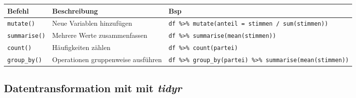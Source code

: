 \documentclass[
  custompaper,
  DIV=11,
  numbers=noendperiod]{scrartcl}
\begin{document}
\begin{longtable}[]{@{}
  >{\raggedright\arraybackslash}p{}
  >{\raggedright\arraybackslash}p{}
  >{\raggedright\arraybackslash}p{}@{}}
\toprule\noalign{}
\begin{minipage}[b]{\linewidth}\raggedright
Befehl
\end{minipage} & \begin{minipage}[b]{\linewidth}\raggedright
Beschreibung
\end{minipage} & \begin{minipage}[b]{\linewidth}\raggedright
Bsp
\end{minipage} \\
\midrule\noalign{}
\endhead
\bottomrule\noalign{}
\endlastfoot
\texttt{mutate()} & Neue Variablen hinzufügen &
\texttt{df\ \%\textgreater{}\%\ mutate(anteil\ =\ stimmen\ /\ sum(stimmen))} \\
\texttt{summarise()} & Mehrere Werte zusammenfassen &
\texttt{df\ \%\textgreater{}\%\ summarise(mean(stimmen))} \\
\texttt{count()} & Häufigkeiten zählen &
\texttt{df\ \%\textgreater{}\%\ count(partei)} \\
\texttt{group\_by()} & Operationen gruppenweise ausführen &
\texttt{df\ \%\textgreater{}\%\ group\_by(partei)\ \%\textgreater{}\%\ summarise(mean(stimmen))} \\
\end{longtable}

\subsection{\texorpdfstring{Datentransformation mit mit
\emph{tidyr}}{Datentransformation mit mit tidyr}}\label{datentransformation-mit-mit-tidyr}
\end{document}
